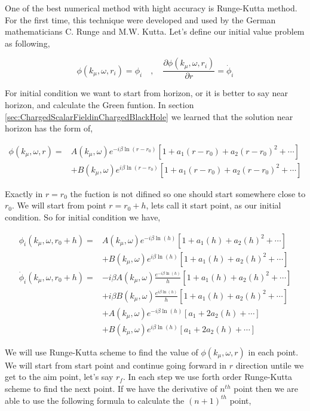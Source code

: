 One of the best numerical method with hight accuracy is Runge-Kutta method. For the first time, this technique were developed and used by the German mathematicians C. Runge and M.W. Kutta. Let's define our initial value problem as following,

\begin{equation}
    \phi(k_\mu,\omega,r_i) = \phi_i \quad , \quad \frac{\partial \phi(k_\mu,\omega,r_i)}{\partial r} = \dot{\phi}_i
\end{equation}

For initial condition we want to start from horizon, or it is better to say near horizon, and calculate the Green funtion. In section \ref{sec:ChargedScalarFieldinChargedBlackHole} we learned that the solution near horizon has the form of,

\begin{align}
    \phi(k_\mu,\omega,r) =& A(k_\mu,\omega)e^{-i\beta\ln{(r-r_0)}}\left[1+a_1(r-r_0)+ a_2(r-r_0)^2 + \cdots \right] \nonumber\\
             & + B(k_\mu,\omega)e^{i\beta\ln{(r-r_0)}}\left[1+a_1(r-r_0)+ a_2(r-r_0)^2 + \cdots \right]
\end{align}

Exactly in $r=r_0$ the fuction is not difined so one should start somewhere close to $r_0$. We will start from point $r = r_0 + h$, lets call it start point, as our initial condition. So for initial condition we have, 

\begin{align}
    \phi_i(k_\mu,\omega,r_0 + h) =& A(k_\mu,\omega)e^{-i\beta\ln{(h)}}\left[1+a_1(h)+ a_2(h)^2 + \cdots \right] \nonumber\\
             & + B(k_\mu,\omega)e^{i\beta\ln{(h)}}\left[1+a_1(h)+ a_2(h)^2 + \cdots \right] \nonumber\\
    \dot{\phi}_i(k_\mu,\omega,r_0 + h) =& -i\beta A(k_\mu,\omega)\frac{e^{-i\beta\ln{(h)}}}{h}\left[1+a_1(h)+ a_2(h)^2 + \cdots \right] \nonumber\\
             & + i\beta B(k_\mu,\omega)\frac{e^{i\beta\ln{(h)}}}{h}\left[1+a_1(h)+ a_2(h)^2 + \cdots \right] \nonumber\\
             & + A(k_\mu,\omega)e^{-i\beta\ln{(h)}}\left[a_1+ 2a_2(h) + \cdots \right] \nonumber\\
             & + B(k_\mu,\omega)e^{i\beta\ln{(h)}}\left[a_1+ 2a_2(h) + \cdots \right]
\end{align}

We will use Runge-Kutta scheme to find the value of $\phi(k_\mu,\omega,r)$ in each point. We will start from start point and continue going forward in $r$ direction untile we get to the aim point, let's say $r_f$. In each step we use forth order Runge-Kutta scheme to find the next point. If we have the derivative of $n^{th}$ point then we are able to use the following formula to calculate the $(n+1)^{th}$ point,

